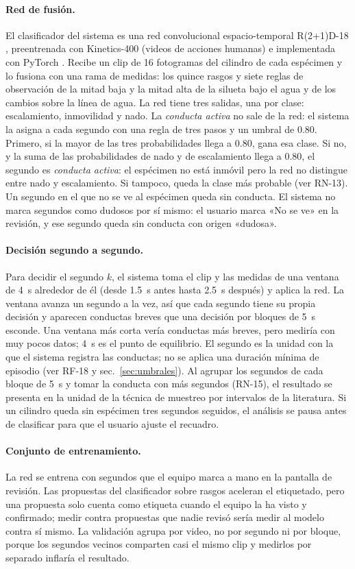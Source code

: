 \paragraph{Red de fusión.} El clasificador del sistema es una red convolucional
espacio-temporal R(2+1)D-18 \cite{tran2018}, preentrenada con Kinetics-400 (videos de acciones
humanas) e implementada con PyTorch \cite{paszke2019}. Recibe un clip de 16
fotogramas del cilindro de cada espécimen y lo fusiona con una rama de medidas: los
quince rasgos y siete reglas de observación de la mitad baja y la mitad alta de la silueta bajo el agua y de los
cambios sobre la línea de agua. La red tiene tres salidas, una por clase: escalamiento,
inmovilidad y nado. La \textit{conducta activa} no sale de la red: el sistema la asigna a
cada segundo con una regla de tres pasos y un umbral de 0.80. Primero, si la mayor de las
tres probabilidades llega a 0.80, gana esa clase. Si no, y la suma de las probabilidades de
nado y de escalamiento llega a 0.80, el segundo es \textit{conducta activa}: el espécimen
no está inmóvil pero la red no distingue entre nado y escalamiento. Si tampoco, queda la
clase más probable (ver RN-13). Un segundo en el que no se ve al espécimen queda sin
conducta. El sistema no marca segundos como dudosos por sí mismo: el usuario marca «No se ve» en la revisión, y ese segundo queda sin conducta con origen «dudosa».

\paragraph{Decisión segundo a segundo.} Para decidir el segundo $k$, el sistema
toma el clip y las medidas de una ventana de 4~s alrededor de él (desde 1.5~s antes
hasta 2.5~s después) y aplica la red. La ventana avanza un segundo a la vez,
así que cada segundo tiene su propia decisión y aparecen conductas breves que una
decisión por bloques de 5~s esconde. Una ventana más corta vería
conductas más breves, pero mediría con muy pocos datos; 4~s es el punto de
equilibrio. El segundo es la unidad con la que el sistema registra las conductas;
no se aplica una duración mínima de episodio (ver RF-18 y
sec.~\ref{sec:umbrales}). Al agrupar los segundos de cada bloque de 5~s y tomar la
conducta con más segundos (RN-15), el resultado se presenta en la unidad de la técnica de
muestreo por intervalos de la literatura. Si un cilindro queda sin espécimen tres segundos seguidos, el análisis se pausa antes de clasificar para que el usuario ajuste el recuadro.

\paragraph{Conjunto de entrenamiento.} La red se entrena con segundos que el equipo
marca a mano en la pantalla de revisión.
Las propuestas del clasificador sobre rasgos aceleran el etiquetado, pero una
propuesta solo cuenta como etiqueta cuando el equipo la ha visto y confirmado;
medir contra propuestas que nadie revisó sería medir al modelo contra sí mismo. La
validación agrupa por video, no por segundo ni por bloque, porque los segundos
vecinos comparten casi el mismo clip y medirlos por separado inflaría el resultado.

